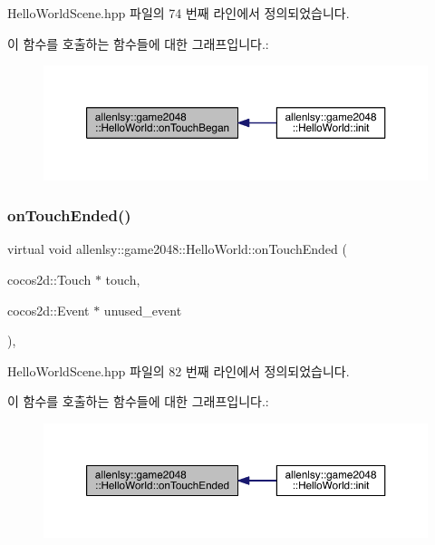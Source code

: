 Hello\+World\+Scene.\+hpp 파일의 74 번째 라인에서 정의되었습니다.

이 함수를 호출하는 함수들에 대한 그래프입니다.\+:
\nopagebreak
\begin{figure}[H]
\begin{center}
\leavevmode
\includegraphics[width=350pt]{classallenlsy_1_1game2048_1_1_hello_world_a0cc62fe1173f141d60833be4804f97d9_icgraph}
\end{center}
\end{figure}
\mbox{\label{classallenlsy_1_1game2048_1_1_hello_world_a99042e68bb9365cdb764cc9c3d9e6197}} 
\subsubsection{\texorpdfstring{on\+Touch\+Ended()}{onTouchEnded()}}
{\footnotesize\ttfamily virtual void allenlsy\+::game2048\+::\+Hello\+World\+::on\+Touch\+Ended (\begin{DoxyParamCaption}\item[{cocos2d\+::\+Touch $\ast$}]{touch,  }\item[{cocos2d\+::\+Event $\ast$}]{unused\+\_\+event }\end{DoxyParamCaption})\hspace{0.3cm}{\ttfamily [inline]}, {\ttfamily [virtual]}}



Hello\+World\+Scene.\+hpp 파일의 82 번째 라인에서 정의되었습니다.

이 함수를 호출하는 함수들에 대한 그래프입니다.\+:
\nopagebreak
\begin{figure}[H]
\begin{center}
\leavevmode
\includegraphics[width=350pt]{classallenlsy_1_1game2048_1_1_hello_world_a99042e68bb9365cdb764cc9c3d9e6197_icgraph}
\end{center}
\end{figure}


